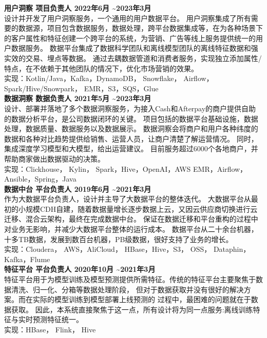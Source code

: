 \documentclass{res}[8.5pt]
\begin{document}
\begin{resume}
{\bf 用户洞察 \hspace{0.25in} \hfill 项目负责人 \hfill 2022年6月  \textasciitilde 2023年3月}\\
设计并开发了用户洞察服务，一个通用的用户数据平台。
用户洞察集成了所有需要的数据源，项目包含数据服务，数据处理，跨平台数据集成等，在为各种场景下的客户属性和特征创建一个跨平台的系统，为营销、广告等线上服务提供统一的用户数据服务。
数据平台集成了数据科学团队和离线模型团队的离线特征数据和强实效的交易、埋点等数据。
通过去耦数据管道和消费者服务，实现独立添加属性/特点，在不依赖于其他团队的情况下，优化市场营销的效果。\\
实现：Kotlin/Java，Kafka，DynamoDB， Snowflake， Airflow，Spark/Hive/Snowpark， EMR，S3，SQS，Glue \\

\newpage
{\bf 数据洞察 \hspace{0.25in} \hfill 数据负责人 \hfill 2021年5月  \textasciitilde 2023年3月}\\
设计、部署并落地了多个数据洞察服务，为接入Cash和Afterpay的商户提供自助的数据分析平台，是公司数据闭环的关键。
项目包括的数据平台基础设施，数据处理，数据质量、数据服务以及数据展示。
数据洞察会将商户和用户各种纬度的数据和各种对比趋势提供给销售、运营人员，让商户清楚了解运营情况。
同时，集成深度学习模型和大模型，给出运营建议。
目前服务超过6000个各地商户，并帮助商家做出数据驱动的决策。\\
实现：Clickhouse， Kylin， Spark，Hive，OpenAI，AWS EMR，Airflow，Ansible，Spring，Java \\

{\bf 数据中台 \hspace{0.25in} \hfill 平台负责人 \hfill 2019年6月  \textasciitilde 2021年3月}\\
作为大数据平台负责人，设计并主导了大数据平台的整体迭代。
大数据平台从最初的小规模CDH自建，随着数据量增长逐步数据上云，又因云供应商切换进行云迁移、混合云架构，最终在完成数据中台。
保证在数据迁移和平台重构的过程中对业务无影响，并减少大数据平台整体的运行成本。
数据平台从二十余台机器，十多TB数据，发展到数百台机器，PB级数据，很好支持了业务的增长。\\
实现：Cloudera， AWS，AliCloud， HBase，Hive，S3， OSS， Dataphin，Kafka，Flume \\


{\bf 特征平台 \hspace{0.25in} \hfill 平台负责人 \hfill 2020年10月  \textasciitilde 2021年3月}\\
特征平台用于为模型训练及模型预测提供所需特征。传统的特征平台主要聚焦于数据清洗、归一化、分箱等数据处理阶段，
但对于数据获取并没有很好的解决方案。而在实际的模型训练到模型部署上线预测的 过程中，最困难的问题就在于数据获取。
因此，本系统直接聚焦于这一点，所有设计将为同一点服务:离线训练特征与实时预测特征统一。\\
实现：HBase， Flink， Hive \\


\end{resume}
\end{document}
